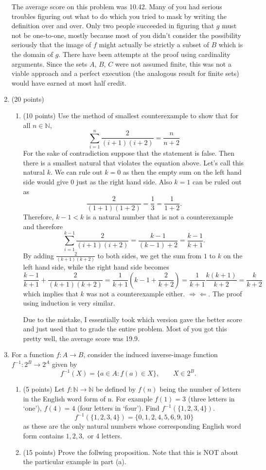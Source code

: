 \documentclass[12pt]{article}
\begin{document}
\begin{enumerate}
\vspace{4cm}
The average score on this problem was 10.42. Many of you had serious troubles figuring out what to do which you tried to mask by writing the definition over and over. Only two people succeeded in figuring that $g$ must not be one-to-one, mostly because most of you didn't consider the possibility seriously that the image of $f$ might actually be strictly a subset of $B$ which is the domain of $g$. There have been attempts at the proof using cardinality arguments. Since the sets $A$, $B$, $C$ were not assumed finite, this was not a viable approach and a perfect execution (the analogous result for finite sets) would have earned at most half credit. 
\newpage
\item (20 points)
\begin{enumerate}
\item (10 points) Use the method of smallest counterexample to show that for all $n\in\mathbb{N}$,
\[
\sum_{i=1}^n\frac{2}{(i+1)(i+2)}=\frac{n}{n+2}
\]
For the sake of contradiction suppose that the statement is false. Then there is a smallest natural that violates the equation above. Let's call this natural $k$. We can rule out $k=0$ as then the empty sum on the left hand side would give $0$ just as the right hand side. Also $k=1$ can be ruled out as
\[
\frac{2}{(1+1)(1+2)}=\frac{1}{3}=\frac{1}{1+2}.
\]
Therefore, $k-1<k$ is a natural number that is not a counterexample and therefore
\[
\sum_{i=1}^{k-1}\frac{2}{(i+1)(i+2)}=\frac{k-1}{(k-1)+2}=\frac{k-1}{k+1}.
\]
By adding $\frac{2}{(k+1)(k+2)}$ to both sides, we get the sum from $1$ to $k$ on the left hand side, while the right hand side becomes
\[
\frac{k-1}{k+1}+\frac{2}{(k+1)(k+2)}=\frac{1}{k+1}\left(k-1+\frac{2}{k+2}\right)=\frac{1}{k+1}\frac{k(k+1)}{k+2}=\frac{k}{k+2}
\]
which implies that $k$ was not a counterexample either. $\Rightarrow\Leftarrow$. The proof using induction is very similar.
\vspace{4cm}

Due to the mistake, I essentially took which version gave the better score and just used that to grade the entire problem. Most of you got this pretty well, the average score was  19.9.
\end{enumerate}
\newpage
\item For a function $f : A\to B$, consider the induced inverse-image function $f^{-1}:2^B\to 2^A$ given by 
\[
f^{-1}(X)=\{a\in A: f(a)\in X\},\qquad X\in 2^B.
\]
\begin{enumerate}
\item (5 points) Let $f: \mathbb{N}\to \mathbb{N}$ be defined by $f(n)$ being the number of letters in the English word form of n. For example $f(1)=3$ (three letters in `one'), $f(4)=4$ (four letters in `four'). Find $f^{-1}(\{1,2,3,4\})$.
\[
f^{-1}(\{1,2,3,4\})=\{0,1,2,4,5,6,9,10\}
\]
as these are the only natural numbers whose corresponding English word form contains $1,2,3,$ or $4$ letters.
\item (15 points) Prove the follwing proposition. Note that this is NOT about the particular example in part (a).


\end{enumerate}
\end{enumerate}
\end{document}
